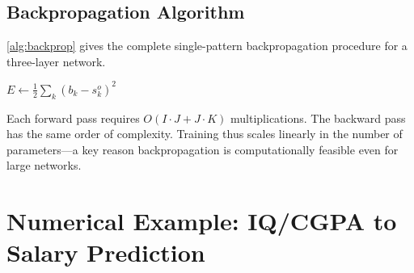 \documentclass[12pt,a4paper]{article}
\begin{document}
\subsection{Backpropagation Algorithm}
\label{subsec:bp-algo}

\cref{alg:backprop} gives the complete single-pattern backpropagation
procedure for a three-layer network.

\begin{algorithm}[htbp]
\DontPrintSemicolon
\caption{Backpropagation for a Three-Layer MLFFNN (single pattern)}
\label{alg:backprop}
\BlankLine
{}
\BlankLine
{}
$E \leftarrow \frac{1}{2}\sum_{k}(b_k - s_k^o)^2$\;
\BlankLine
{}
\BlankLine
{}
\BlankLine
{}
\;
\end{algorithm}

\begin{keyinsight}[title=Computational Complexity]
  Each forward pass requires $O(I \cdot J + J \cdot K)$ multiplications.
  The backward pass has the same order of complexity.  Training thus scales
  linearly in the number of parameters---a key reason backpropagation is
  computationally feasible even for large networks.
\end{keyinsight}

\section{Numerical Example: IQ/CGPA to Salary Prediction}
\label{sec:example}
\end{document}
